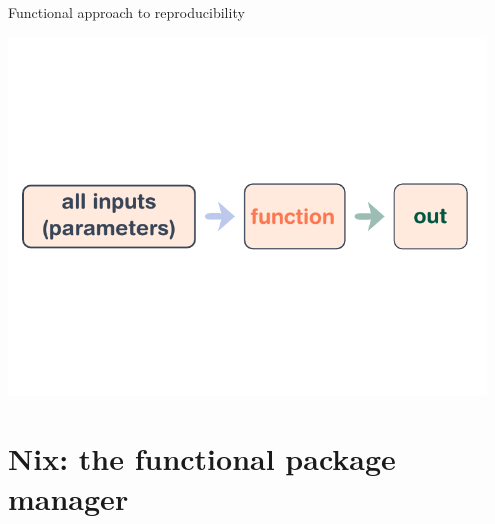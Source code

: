 \documentclass[a4paper]{beamer}
\begin{document}
\begin{frame}{Functional approach to reproducibility}
    \begin{center}
        \includegraphics[width=0.95\textwidth]{img/schema-build-functional-correct.pdf}
    \end{center}
\end{frame}

\section{Nix: the functional package manager}
\end{document}
